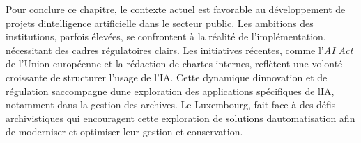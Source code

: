 Pour conclure ce chapitre, le contexte actuel est favorable au développement de projets
d\textquotesingle intelligence artificielle dans le secteur public. Les
ambitions des institutions, parfois élevées, se confrontent à la réalité
de l'implémentation, nécessitant des cadres régulatoires clairs. Les
initiatives récentes, comme l'\emph{AI Act} de l'Union européenne et la rédaction de
chartes internes, reflètent une volonté croissante de structurer l'usage
de l'IA. Cette dynamique
d\textquotesingle innovation et de régulation
s\textquotesingle accompagne d\textquotesingle une exploration des
applications spécifiques de l\textquotesingle IA, notamment dans la
gestion des archives. Le Luxembourg, fait face à des défis
archivistiques qui encouragent cette exploration de solutions
d\textquotesingle automatisation afin de moderniser et optimiser leur gestion et conservation.
